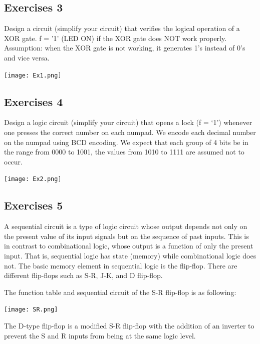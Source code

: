\documentclass[11pt]{article}
\begin{document}
\subsection*{Exercises 3}
Design a circuit (simplify your circuit) that verifies the logical operation of a XOR gate. f = '1' (LED ON) if the XOR gate does NOT work properly. Assumption: when the XOR gate is not working, it
generates 1's instead of 0's and vice versa.

\begin{center}
\texttt{[image: Ex1.png]}    
\end{center}



\subsection*{Exercises 4}
Design a logic circuit (simplify your circuit) that opens a lock (f = ‘1’) whenever one presses the correct number on each numpad. We encode each decimal number on the numpad using BCD encoding. We expect that each group of 4 bits be in the range from 0000 to 1001, the values from 1010 to 1111 are assumed not to occur.

\begin{center}
\texttt{[image: Ex2.png]}    
\end{center}


\subsection*{Exercises 5}
A  sequential circuit is a type of logic circuit whose output depends not only on the present value of its input signals but on the sequence of past inputs. This is in contrast to combinational logic, whose output is a function of only the present input. That is, sequential logic has state (memory) while combinational logic does not. The basic memory element in sequential logic is the flip-flop. There are different flip-flops such as S-R, J-K, and D flip-flop. 



\bigskip

The function table and sequential circuit of the S-R flip-flop is as following: 

\begin{center}
\texttt{[image: SR.png]}    
\end{center}


The D-type flip-flop is a modified S-R flip-flop with the addition of an inverter to prevent the S and R inputs from being at the same logic level.
\end{document}
